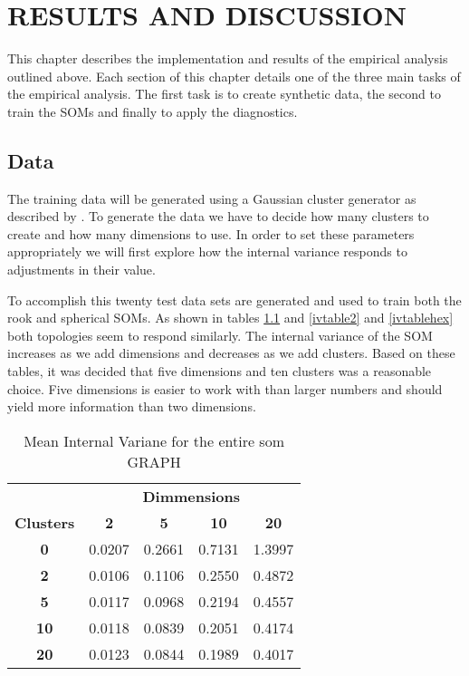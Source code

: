 \chapter{RESULTS AND DISCUSSION}
This chapter describes the implementation and results of the empirical analysis
outlined above.  Each section of this chapter details one of the three main
tasks of the empirical analysis.  The first task is to create synthetic data,
the second to train the SOMs and finally to apply the diagnostics.

\section{Data}
The training data will be generated using a Gaussian cluster generator as
described by \cite{handl}.  To generate the data we have to decide how many
clusters to create and how many dimensions to use.  In order to set these
parameters appropriately we will first explore how the internal variance
responds to adjustments in their value.

To accomplish this twenty test data sets are generated and used to train both
the rook and spherical SOMs. As shown in tables \ref{ivtable1} and
\ref{ivtable2} and \ref{ivtablehex} both topologies seem to respond similarly. The internal
variance of the SOM increases as we add dimensions and decreases as we add
clusters. Based on these tables, it was decided that five dimensions and ten
clusters was a reasonable choice. Five dimensions is easier to work with than
larger numbers and should yield more information than two dimensions. 


\begin{table}
\centering
\caption{Mean Internal Variane for the entire som GRAPH}
\label{ivtable1}
\begin{tabular}{|c||c|c|c|c|}
\hline
&\multicolumn{4}{c|}{\textbf{Dimmensions}}\\
\textbf{Clusters} & \multicolumn{1}{c}{\textbf{2}} &
\multicolumn{1}{c}{\textbf{5}} & \multicolumn{1}{c}{\textbf{10}} &
\multicolumn{1}{c|}{\textbf{20}}\\
\hline
\hline
\textbf{0} & 0.0207& 0.2661& 0.7131& 1.3997 \\
\hline
\textbf{2} & 0.0106& 0.1106& 0.2550& 0.4872 \\
\hline
\textbf{5} & 0.0117& 0.0968& 0.2194& 0.4557 \\
\hline
\textbf{10} & 0.0118& 0.0839& 0.2051& 0.4174 \\
\hline
\textbf{20} & 0.0123& 0.0844& 0.1989& 0.4017 \\
\hline
\end{tabular} \end{table}


